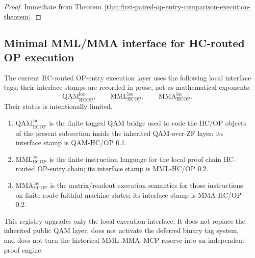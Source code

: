 \begin{proof}
Immediate from Theorem~\ref{thm:first-paired-op-entry-comparison-execution-theorem}.
\end{proof}



\subsection{Minimal MML/MMA interface for HC-routed OP execution}
\label{subsec:minimal-mml-mma-interface-hc-routed-op-execution}

\begin{definition}
\label{def:r07-local-language-version-registry}
The current HC-routed OP-entry execution layer uses the following local interface tags; their interface stamps are recorded in prose, not as mathematical exponents:
\[
 \mathrm{QAM}_{\mathrm{HCOP}}^{\mathrm{loc}},
 \qquad
 \mathrm{MML}_{\mathrm{HCOP}}^{\mathrm{loc}},
 \qquad
 \mathrm{MMA}_{\mathrm{HCOP}}^{\mathrm{loc}}.
\]
Their status is intentionally limited.
\begin{enumerate}[leftmargin=2em,label=(\alph*)]
 \item \(\mathrm{QAM}_{\mathrm{HCOP}}^{\mathrm{loc}}\) is the finite tagged QAM bridge used to code the HC/OP objects of the present subsection inside the inherited QAM-over-ZF layer; its interface stamp is QAM-HC/OP 0.1.
 \item \(\mathrm{MML}_{\mathrm{HCOP}}^{\mathrm{loc}}\) is the finite instruction language for the local proof chain HC-routed OP-entry chain; its interface stamp is MML-HC/OP 0.2.
 \item \(\mathrm{MMA}_{\mathrm{HCOP}}^{\mathrm{loc}}\) is the matrix/readout execution semantics for those instructions on finite route-faithful machine states; its interface stamp is MMA-HC/OP 0.2.
\end{enumerate}
This registry upgrades only the local execution interface. It does not replace the inherited public QAM layer, does not activate the deferred binary tag system, and does not turn the historical MML--MMA--MCP reserve into an independent proof engine.
\end{definition}

